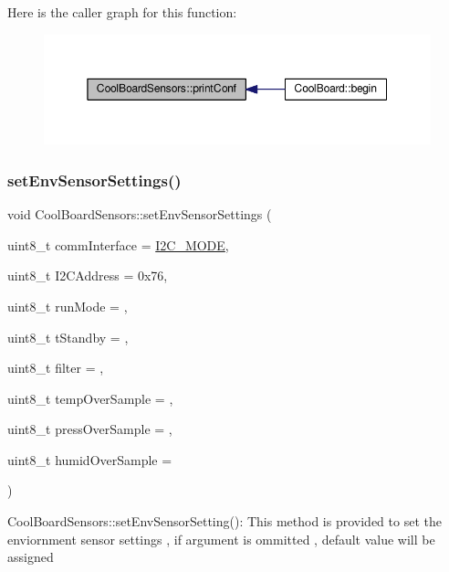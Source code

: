 Here is the caller graph for this function\+:
\nopagebreak
\begin{figure}[H]
\begin{center}
\leavevmode
\includegraphics[width=350pt]{de/d46/class_cool_board_sensors_af6fd79505815b204c178617ecf54c873_icgraph}
\end{center}
\end{figure}
\mbox{\label{class_cool_board_sensors_a406307ffd70272282d91479c7ed8d66f}} 
\subsubsection{\texorpdfstring{set\+Env\+Sensor\+Settings()}{setEnvSensorSettings()}}
{\footnotesize\ttfamily void Cool\+Board\+Sensors\+::set\+Env\+Sensor\+Settings (\begin{DoxyParamCaption}\item[{uint8\+\_\+t}]{comm\+Interface = {\ttfamily \hyperlink{_cool_spark_fun_b_m_e280_8h_a5cd01756030509b764d43a2b8c94fce8}{I2\+C\+\_\+\+M\+O\+DE}},  }\item[{uint8\+\_\+t}]{I2\+C\+Address = {\ttfamily 0x76},  }\item[{uint8\+\_\+t}]{run\+Mode = {},  }\item[{uint8\+\_\+t}]{t\+Standby = {},  }\item[{uint8\+\_\+t}]{filter = {},  }\item[{uint8\+\_\+t}]{temp\+Over\+Sample = {},  }\item[{uint8\+\_\+t}]{press\+Over\+Sample = {},  }\item[{uint8\+\_\+t}]{humid\+Over\+Sample = {} }\end{DoxyParamCaption})}

Cool\+Board\+Sensors\+::set\+Env\+Sensor\+Setting()\+: This method is provided to set the enviornment sensor settings , if argument is ommitted , default value will be assigned 

